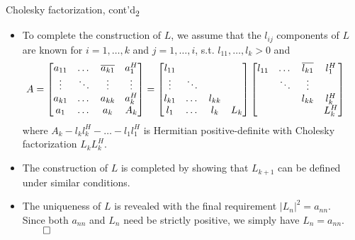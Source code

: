\documentclass[t,usepdftitle=false]{beamer}
\begin{document}
\begin{frame}{Cholesky factorization, cont'd\textsubscript{2}}
\begin{itemize}
\item To complete the construction of $L$, we assume that the $l_{ij}$ components of $L$ are known for $i=1,\dots,k$ and $j=1,\dots,i$, s.t. $l_{11},\dots,l_{k}>0$ and
{
\begin{align*}
\hspace{-.5cm}A=
\begin{bmatrix}
a_{11}   & \dots &\overline{a_{k1}}  &a_1^H\\
\vdots   & \ddots&\vdots             &\vdots\\
a_{k1 }  & \dots &a_{kk}             &a_{k}^H\\
a_1      & \dots &a_{k}              &A_k
\end{bmatrix}
=
\begin{bmatrix}
l_{11}   &      &           &\\
\vdots   &\ddots&           &\\
l_{k1}   &\dots &l_{kk}     &\\
l_1      &\dots &l_{k}      &L_k
\end{bmatrix}
\begin{bmatrix}
l_{11}   &\dots &\overline{l_{k1}}&l_1^H  \\
         &\ddots&\vdots           &       \\
         &      &l_{kk}           &l_{k}^H\\
         &      &                 &L_k^H
\end{bmatrix}
\end{align*}
}\normalsize
where $\displaystyle A_k-l_{k}l_{k}^H-\dots-l_1l_1^H$ is Hermitian positive-definite with Cholesky factorization $L_kL_k^H$.
\item The construction of $L$ is completed by showing that $L_{k+1}$ can be defined under similar conditions.
\item The uniqueness of $L$ is revealed with the final requirement $|L_{n}|^2=a_{nn}.$\vspace{.05cm}\\
Since both $a_{nn}$ and $L_{n}$ need be strictly positive, we simply have $L_{n}=a_{nn}$.\\
\hfill$\qed$
\end{itemize}
\end{frame}
\end{document}
